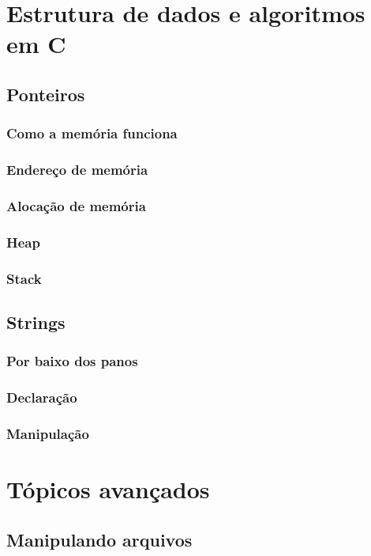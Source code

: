 \documentclass{book}
\begin{document}
\chapter{Estrutura de dados e algoritmos em C}

\section{Ponteiros}
\subsection{Como a memória funciona}
\subsection{Endereço de memória}
\subsection{Alocação de memória}
\subsection{Heap}
\subsection{Stack}

\section{Strings}
\subsection{Por baixo dos panos}
\subsection{Declaração}
\subsection{Manipulação}

\chapter{Tópicos avançados}

\section{Manipulando arquivos}
\end{document}
